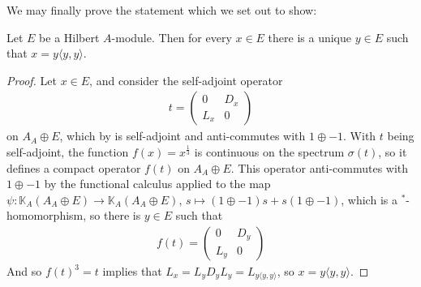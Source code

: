 We may finally prove the statement which we set out to show:
\begin{proposition}
	Let $E$ be a Hilbert $A$-module. Then for every $x \in E$ there is a unique $y \in E$ such that $x = y \langle y , y \rangle$.
	\label{mult:EeqEEE}
\end{proposition}
\begin{proof}
	Let $x \in E$, and consider the self-adjoint operator
	\begin{align*}
		t = \begin{pmatrix}
			0 & D_x \\
			L_x & 0
		\end{pmatrix}
	\end{align*}
	on $A_A \oplus E$, which by  is self-adjoint and anti-commutes with $1 \oplus -1$. With $t$ being self-adjoint, the function $f(x) = x^{\frac13}$ is continuous on the spectrum $\sigma(t)$, so it defines a compact operator $f(t)$ on $A_A \oplus E$. This operator anti-commutes with $1 \oplus -1$ by the functional calculus applied to the map $\psi \colon \mathbb{K}_A(A_A \oplus E) \to \mathbb{K}_A(A_A \oplus E)$, $s \mapsto (1 \oplus -1) s + s(1 \oplus -1)$, which is a $^*$-homomorphism, so there is $y \in E$ such that
	\begin{align*}
		f(t) = \begin{pmatrix}
			0 & D_y \\
			L_y & 0
		\end{pmatrix}
	\end{align*}
	And so $f(t)^3 = t$ implies that $L_x = L_y D_y L_y = L_{y \langle y,y \rangle}$, so $x = y \langle y, y \rangle$.
\end{proof}

